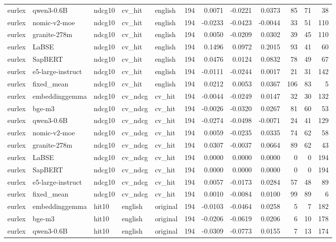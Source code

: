 \begin{tabular}{lllllrrrrrrr}
eurlex & qwen3-0.6B & ndcg10 & cv\_hit & english & 194 & 0.0071 & -0.0221 & 0.0373 & 85 & 71 & 38 \\
eurlex & nomic-v2-moe & ndcg10 & cv\_hit & english & 194 & -0.0233 & -0.0423 & -0.0044 & 33 & 51 & 110 \\
eurlex & granite-278m & ndcg10 & cv\_hit & english & 194 & 0.0050 & -0.0209 & 0.0302 & 39 & 45 & 110 \\
eurlex & LaBSE & ndcg10 & cv\_hit & english & 194 & 0.1496 & 0.0972 & 0.2015 & 93 & 41 & 60 \\
eurlex & SapBERT & ndcg10 & cv\_hit & english & 194 & 0.0476 & 0.0124 & 0.0832 & 78 & 49 & 67 \\
eurlex & e5-large-instruct & ndcg10 & cv\_hit & english & 194 & -0.0111 & -0.0244 & 0.0017 & 21 & 31 & 142 \\
eurlex & fixed\_mean & ndcg10 & cv\_hit & english & 194 & 0.0212 & 0.0053 & 0.0367 & 106 & 83 & 5 \\
eurlex & embeddinggemma & ndcg10 & cv\_ndcg & cv\_hit & 194 & -0.0044 & -0.0249 & 0.0147 & 32 & 30 & 132 \\
eurlex & bge-m3 & ndcg10 & cv\_ndcg & cv\_hit & 194 & -0.0026 & -0.0320 & 0.0267 & 81 & 60 & 53 \\
eurlex & qwen3-0.6B & ndcg10 & cv\_ndcg & cv\_hit & 194 & -0.0274 & -0.0498 & -0.0071 & 24 & 41 & 129 \\
eurlex & nomic-v2-moe & ndcg10 & cv\_ndcg & cv\_hit & 194 & 0.0059 & -0.0235 & 0.0335 & 74 & 62 & 58 \\
eurlex & granite-278m & ndcg10 & cv\_ndcg & cv\_hit & 194 & 0.0307 & -0.0037 & 0.0664 & 89 & 62 & 43 \\
eurlex & LaBSE & ndcg10 & cv\_ndcg & cv\_hit & 194 & 0.0000 & 0.0000 & 0.0000 & 0 & 0 & 194 \\
eurlex & SapBERT & ndcg10 & cv\_ndcg & cv\_hit & 194 & 0.0000 & 0.0000 & 0.0000 & 0 & 0 & 194 \\
eurlex & e5-large-instruct & ndcg10 & cv\_ndcg & cv\_hit & 194 & 0.0057 & -0.0173 & 0.0284 & 57 & 48 & 89 \\
eurlex & fixed\_mean & ndcg10 & cv\_ndcg & cv\_hit & 194 & 0.0010 & -0.0084 & 0.0100 & 99 & 89 & 6 \\
eurlex & embeddinggemma & hit10 & english & original & 194 & -0.0103 & -0.0464 & 0.0258 & 5 & 7 & 182 \\
eurlex & bge-m3 & hit10 & english & original & 194 & -0.0206 & -0.0619 & 0.0206 & 6 & 10 & 178 \\
eurlex & qwen3-0.6B & hit10 & english & original & 194 & -0.0309 & -0.0773 & 0.0155 & 7 & 13 & 174 \\

\end{tabular}
